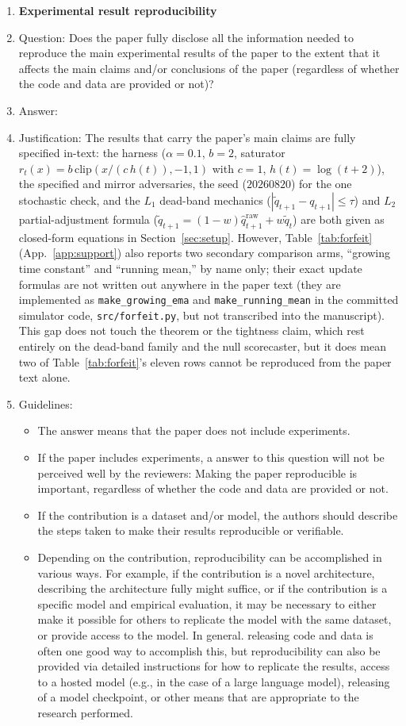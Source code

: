 \begin{enumerate}
    \item {\bf Experimental result reproducibility}
    \item[] Question: Does the paper fully disclose all the information needed to reproduce the main experimental results of the paper to the extent that it affects the main claims and/or conclusions of the paper (regardless of whether the code and data are provided or not)?
    \item[] Answer: \answerNo{}
    \item[] Justification: The results that carry the paper's main claims are fully specified in-text: the harness ($\alpha = 0.1$, $b = 2$, saturator $r_t(x) = b\,\mathrm{clip}(x/(c\,h(t)),-1,1)$ with $c=1$, $h(t)=\log(t+2)$), the specified and mirror adversaries, the seed ($20260820$) for the one stochastic check, and the $L_1$ dead-band mechanics ($|\tilde q_{t+1}-q_{t+1}|\le\tau$) and $L_2$ partial-adjustment formula ($\tilde q_{t+1} = (1-w)\hat q^{\mathrm{raw}}_{t+1}+w\tilde q_t$) are both given as closed-form equations in Section~\ref{sec:setup}. However, Table~\ref{tab:forfeit} (App.~\ref{app:support}) also reports two secondary comparison arms, ``growing time constant'' and ``running mean,'' by name only; their exact update formulas are not written out anywhere in the paper text (they are implemented as \texttt{make\_growing\_ema} and \texttt{make\_running\_mean} in the committed simulator code, \texttt{src/forfeit.py}, but not transcribed into the manuscript). This gap does not touch the theorem or the tightness claim, which rest entirely on the dead-band family and the null scorecaster, but it does mean two of Table~\ref{tab:forfeit}'s eleven rows cannot be reproduced from the paper text alone.
    \item[] Guidelines:
    \begin{itemize}
        \item The answer \answerNA{} means that the paper does not include experiments.
        \item If the paper includes experiments, a \answerNo{} answer to this question will not be perceived well by the reviewers: Making the paper reproducible is important, regardless of whether the code and data are provided or not.
        \item If the contribution is a dataset and\slash or model, the authors should describe the steps taken to make their results reproducible or verifiable.
        \item Depending on the contribution, reproducibility can be accomplished in various ways. For example, if the contribution is a novel architecture, describing the architecture fully might suffice, or if the contribution is a specific model and empirical evaluation, it may be necessary to either make it possible for others to replicate the model with the same dataset, or provide access to the model. In general. releasing code and data is often one good way to accomplish this, but reproducibility can also be provided via detailed instructions for how to replicate the results, access to a hosted model (e.g., in the case of a large language model), releasing of a model checkpoint, or other means that are appropriate to the research performed.

\end{itemize}
\end{enumerate}

